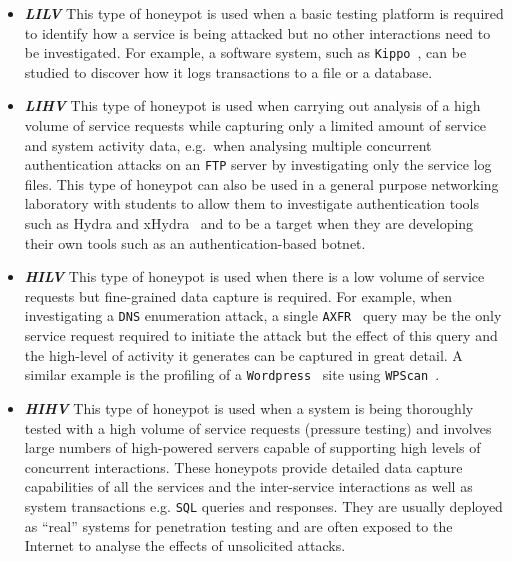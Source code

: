 \documentclass[10pt,journal]{IEEEtran}
\begin{document}
\begin{itemize}

  \item \noindent \emph{\textbf{LILV}} This type of honeypot is used when a
    basic testing platform is required to identify how a service is being
    attacked but no other interactions need to be investigated. For example, a
    software system, such as \texttt{Kippo}~\cite{SH:15}, can be studied to
    discover how it logs transactions to a file or a database. 

  \item \noindent \emph{\textbf{LIHV}} This type of honeypot is used when
    carrying out analysis of a high volume of service requests while capturing
    only a limited amount of service and system activity data, e.g.\ when
    analysing multiple concurrent authentication attacks on an
    \texttt{FTP} server by investigating only the service log files. This type of
    honeypot can also be used in a general purpose networking laboratory with
    students to allow them to investigate authentication tools such as Hydra
    and xHydra~\cite{RS:15} and to be a target when they are developing their
    own tools such as an authentication-based botnet.

  \item \noindent \emph{\textbf{HILV}} This type of honeypot is used when there
    is a low volume of service requests but fine-grained data capture is
    required. For example, when investigating a \texttt{DNS} enumeration
    attack, a single \texttt{AXFR}~\cite{EL:10} query may be the only service
    request required to initiate the attack but the effect of this query and
    the high-level of activity it generates can be captured in great detail.  A
    similar example is the profiling of a \texttt{Wordpress}~\cite{WP:17} site
    using \texttt{WPScan}~\cite{WT:17}.

  \item \noindent \emph{\textbf{HIHV}} This type of honeypot is used when a
    system is being thoroughly tested with a high volume of service requests
    (pressure testing) and involves large numbers of high-powered servers capable
    of supporting high levels of concurrent interactions. These honeypots
    provide detailed data capture capabilities of all the services and the
    inter-service interactions as well as system transactions e.g. \texttt{SQL}
    queries and responses. They are usually deployed as ``real'' systems for
    penetration testing and are often exposed to the Internet to analyse the
    effects of unsolicited attacks.  

\end{itemize}
\end{document}
